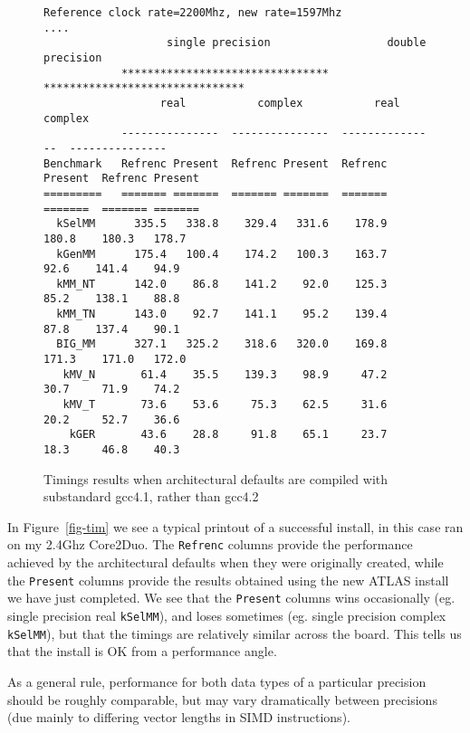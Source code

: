\documentclass[11pt]{article}
\begin{document}
\begin{figure}[p]
\begin{footnotesize}
\begin{verbatim}
Reference clock rate=2200Mhz, new rate=1597Mhz
....
                   single precision                  double precision
            ********************************   *******************************
                  real           complex           real           complex
            ---------------  ---------------  ---------------  ---------------
Benchmark   Refrenc Present  Refrenc Present  Refrenc Present  Refrenc Present
=========   ======= =======  ======= =======  ======= =======  ======= =======
  kSelMM      335.5   338.8    329.4   331.6    178.9   180.8    180.3   178.7
  kGenMM      175.4   100.4    174.2   100.3    163.7    92.6    141.4    94.9
  kMM_NT      142.0    86.8    141.2    92.0    125.3    85.2    138.1    88.8
  kMM_TN      143.0    92.7    141.1    95.2    139.4    87.8    137.4    90.1
  BIG_MM      327.1   325.2    318.6   320.0    169.8   171.3    171.0   172.0
   kMV_N       61.4    35.5    139.3    98.9     47.2    30.7     71.9    74.2
   kMV_T       73.6    53.6     75.3    62.5     31.6    20.2     52.7    36.6
    kGER       43.6    28.8     91.8    65.1     23.7    18.3     46.8    40.3
\end{verbatim}
\end{footnotesize}
\caption{Timings results when architectural defaults are compiled with 
         substandard gcc4.1, rather than gcc4.2}
\label{fig-tim-gcc4}
\end{figure}

In Figure~\ref{fig-tim} we see a typical printout of a successful install,
in this case ran on my 2.4Ghz Core2Duo.
The {\tt Refrenc} 
columns provide the performance achieved by the architectural defaults when
they were
originally created, while the  {\tt Present} columns provide the results
obtained using the new ATLAS install we have just completed.  We see that
the {\tt Present} columns wins occasionally (eg. single precision real
{\tt kSelMM}), and loses sometimes (eg. single precision complex {\tt kSelMM}),
but that the timings are relatively similar across the board.  This tells
us that the install is OK from a performance angle.

As a general rule, performance for both data types of a particular precision
should be roughly comparable, but may vary dramatically between precisions
(due mainly to differing vector lengths in SIMD instructions).
\end{document}
